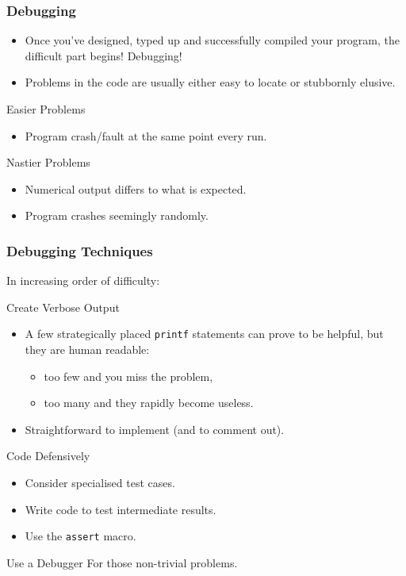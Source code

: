 \documentclass[table]{beamer}
\begin{document}
\begin{frame}
\frametitle{Debugging}
\begin{itemize}
\item Once you've designed, typed up and successfully compiled your program, the difficult part begins! Debugging!
\item Problems in the code are usually either easy to locate or stubbornly elusive.
\end{itemize}

\begin{exampleblock}{Easier Problems}
\begin{itemize}
\item Program crash/fault at the same point every run.
\end{itemize}
\end{exampleblock}

\begin{alertblock}{Nastier Problems}
\begin{itemize}
\item Numerical output differs to what is expected.
\item Program crashes seemingly randomly.
\end{itemize}
\end{alertblock}
\end{frame}

\begin{frame}
\frametitle{Debugging Techniques}
In increasing order of difficulty:
\begin{block}{Create Verbose Output}
\begin{itemize}
\item A few strategically placed {\tt printf} statements can prove to be helpful, but they are human readable:
\begin{itemize}
\item too few and you miss the problem,
\item too many and they rapidly become useless.
\end{itemize}
\item Straightforward to implement (and to comment out).
\end{itemize}
\end{block}

\begin{block}{Code Defensively}
\begin{itemize}
\item Consider specialised test cases.
\item Write code to test intermediate results.
\item Use the {\tt assert} macro.
\end{itemize}
\end{block}

\begin{block}{Use a Debugger}
For those non-trivial problems.
\end{block}
\end{frame}
\end{document}
